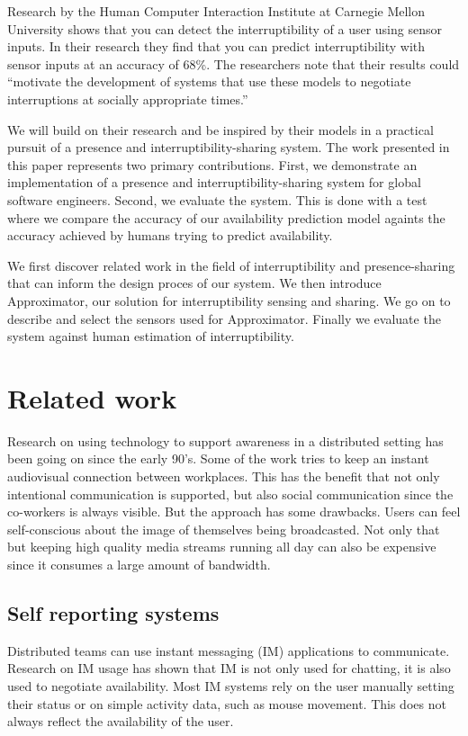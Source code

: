 \documentclass{sigchi}
\begin{document}
Research by the Human Computer Interaction Institute at Carnegie Mellon University \cite{fogarty2005predicting} shows that you can detect the interruptibility of a user using sensor inputs.
In their research they find that you can predict interruptibility with sensor inputs at an accuracy of 68\%.
The researchers note that their results could ``motivate the development of systems that use these models to negotiate interruptions at socially appropriate times.''

We will build on their research and be inspired by their models in a practical pursuit of a presence and interruptibility-sharing system.
The work presented in this paper represents two primary contributions.
First, we demonstrate an implementation of a presence and interruptibility-sharing system for global software engineers.
Second, we evaluate the system.
This is done with a test where we compare the accuracy of our availability prediction model againts the accuracy achieved by humans trying to predict availability.

We first discover related work in the field of interruptibility and presence-sharing that can inform the design proces of our system.
We then introduce Approximator, our solution for interruptibility sensing and sharing.
We go on to describe and select the sensors used for Approximator.
Finally we evaluate the system against human estimation of interruptibility.

\section{Related work}
Research on using technology to support awareness in a distributed setting has been going on since the early 90’s.
Some of the work \cite{bly1993media} \cite{gaver1992realizing} \cite{mantei1991experiences} tries to keep an instant audiovisual connection between workplaces.
This has the benefit that not only intentional communication is supported, but also social communication since the co-workers is always visible.
But the approach has some drawbacks.
Users can feel self-conscious about the image of themselves being broadcasted.
Not only that but keeping high quality media streams running all day can also be expensive since it consumes a large amount of bandwidth.

\subsection{Self reporting systems}
Distributed teams can use instant messaging (IM) applications to communicate.
Research on IM usage \cite{nardi2000interaction} \cite{handel2002chat} \cite{tang2001connexus} has shown that IM is not only used for chatting, it is also used to negotiate availability.
Most IM systems rely on the user manually setting their status or on simple activity data, such as mouse movement.
This does not always reflect the availability of the user.
\end{document}
